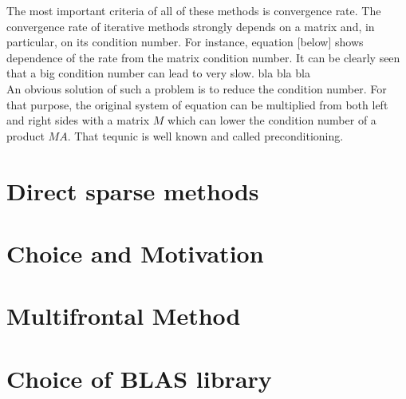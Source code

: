 


 

The most important criteria of all of these methods is convergence rate. The convergence rate of iterative methods strongly depends on a matrix and, in particular, on its condition number. For instance, equation [below] shows dependence of the rate from the matrix condition number. It can be clearly seen that a big condition number can lead to very slow. bla bla bla \\


An obvious solution of such a problem is to reduce the condition number. For that purpose, the original system of equation can be multiplied from both left and right sides with a matrix $M$ which can lower the condition number of a product $MA$. That tequnic is well known and called preconditioning. 


\section{Direct sparse methods}
\label{subseq:sparse methods}








\section{Choice and Motivation}
\label{subseq:choice and motivation}



\section{Multifrontal Method}
\label{subseq:multifrontal method}

\section{Choice of BLAS library}
\label{subseq:blas-comparison}

